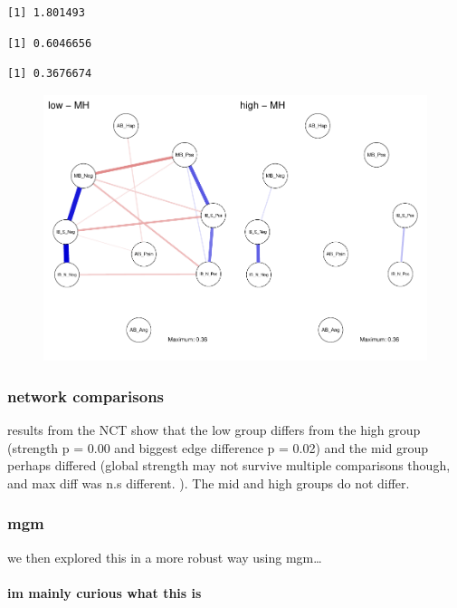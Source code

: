 \documentclass[man,floatsintext]{apa6}
\let\oldparagraph\paragraph
\renewcommand{\paragraph}[1]{\oldparagraph{#1}\mbox{}}
\begin{document}
\begin{verbatim}
[1] 1.801493
\end{verbatim}

\begin{verbatim}
[1] 0.6046656
\end{verbatim}

\begin{verbatim}
[1] 0.3676674
\end{verbatim}

\begin{figure}
\centering
\includegraphics{script_files/figure-latex/glasso networks-2.pdf}
\caption{}
\end{figure}

\subsubsection{network comparisons}\label{network-comparisons}

results from the NCT show that the low group differs from the high group
(strength p = 0.00 and biggest edge difference p = 0.02) and the mid
group perhaps differed (global strength may not survive multiple
comparisons though, and max diff was n.s different. ). The mid and high
groups do not differ.

\subsubsection{mgm}\label{mgm}

we then explored this in a more robust way using mgm\ldots{}

\paragraph{im mainly curious what this
is}\label{im-mainly-curious-what-this-is}
\end{document}
